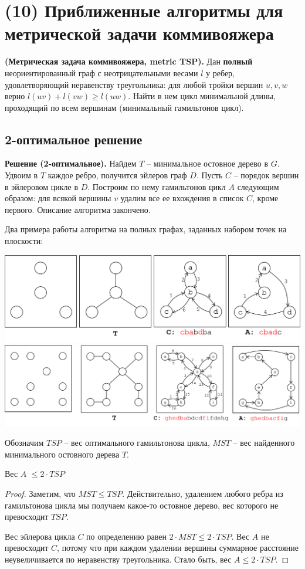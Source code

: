 \section{(10) Приближенные алгоритмы для метрической задачи коммивояжера}

\begin{problem*}\textbf{(Метрическая задача коммивояжера, metric TSP).} Дан \textbf{полный} неориентированный граф с неотрицательными весами $l$ у ребер, удовлетворяющий неравенству треугольника: для любой тройки вершин $u, v, w$ верно $l(uv) + l(vw) \geq l(uw)$. Найти в нем цикл минимальной длины, проходящий по всем вершинам (минимальный гамильтонов цикл). \end{problem*}

\subsection{2-оптимальное решение}
\textbf{Решение (2-оптимальное).} Найдем $T$ -- минимальное остовное дерево в $G$. Удвоим в $T$ каждое ребро, получится эйлеров граф $D$. Пусть $C$ -- порядок вершин в эйлеровом цикле в $D$. Построим по нему гамильтонов цикл $A$ следующим образом: для всякой вершины $v$ удалим все ее вхождения в список $C$, кроме первого. Описание алгоритма закончено.

Два примера работы алгоритма на полных графах, заданных набором точек на плоскости:

\includegraphics[width=\textwidth]{figures/ex_shorthamil.png} \\
\includegraphics[width=\textwidth]{figures/ex_longhamil.png}

Обозначим $TSP$ -- вес оптимального гамильтонова цикла, $MST$ -- вес найденного минимального остовного дерева $T$. 
\begin{theorem*} Вес $A$ $\leq 2 \cdot TSP$ \end{theorem*}
\begin{proof}
Заметим, что $MST \leq TSP$. Действительно, удалением любого ребра из гамильтонова цикла мы получаем какое-то остовное дерево, вес которого не превосходит $TSP$.

Вес эйлерова цикла $C$ по определению равен $2\cdot MST \leq 2\cdot TSP$. Вес $A$ не превосходит $C$, потому что при каждом удалении вершины суммарное расстояние неувеличивается по неравенству треугольника. Стало быть, вес $A \leq 2 \cdot TSP$.
\end{proof}

